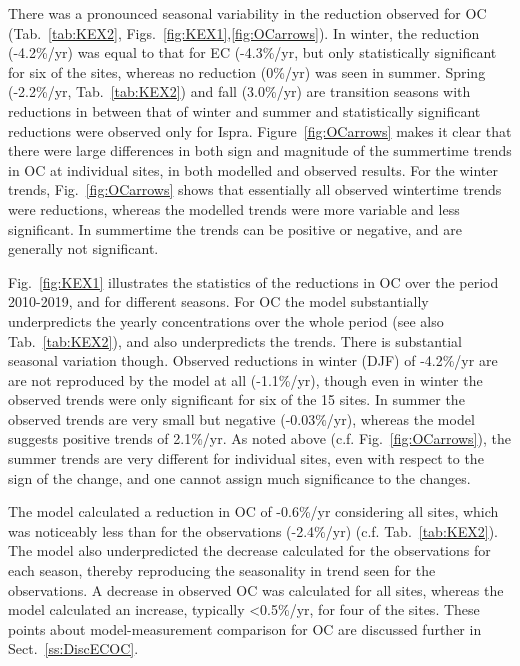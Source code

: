 
There was a pronounced seasonal variability in the reduction observed for
OC (Tab.~\ref{tab:KEX2}, Figs.~\ref{fig:KEX1},\ref{fig:OCarrows}). In winter, the
 reduction (-4.2\%/yr) was equal to that for
EC (-4.3\%/yr, but only statistically significant for six of the sites,
whereas no reduction (0\%/yr) was seen in summer. Spring (-2.2\%/yr, Tab.~\ref{tab:KEX2}) and fall (3.0\%/yr) are transition seasons with reductions in between
that of winter and summer and statistically significant reductions were
observed only for Ispra. 
%
Figure~\ref{fig:OCarrows} makes it clear that there were large differences in both sign and magnitude of the summertime trends in OC at individual sites, in both modelled and observed results. For the winter trends, Fig.~\ref{fig:OCarrows} shows that essentially all observed wintertime trends were reductions, whereas the modelled trends were more variable and less significant. In summertime the trends can be positive or negative, and are generally not significant.


Fig.~\ref{fig:KEX1} illustrates the statistics of the reductions in OC  over the period 2010-2019, and for different seasons. For OC the model substantially underpredicts the yearly concentrations over the whole period (see also Tab.~\ref{tab:KEX2}), and also underpredicts the trends. There is substantial seasonal variation though. Observed reductions in winter (DJF) of -4.2\%/yr are are not reproduced by the model at all (-1.1\%/yr), though even in winter the observed trends were only significant for six of the 15 sites. In summer the observed trends are very small but negative (-0.03\%/yr), whereas the model suggests positive trends of 2.1\%/yr. As noted above (c.f. Fig.~\ref{fig:OCarrows}), the summer trends are very different for individual sites, even with respect to the sign of the change, and one cannot assign much significance to the changes. 

The model calculated a
reduction in OC of -0.6\%/yr considering all sites, which was noticeably
less than for the observations (-2.4\%/yr) (c.f. Tab.~\ref{tab:KEX2}). The model also underpredicted
the decrease calculated for the observations for each season, thereby
reproducing the seasonality in trend seen for the observations. A decrease
in observed OC was calculated for all sites, whereas the model calculated
an increase, typically <0.5\%/yr, for four of the sites. These points about model-measurement comparison for OC are discussed further in Sect.~\ref{ss:DiscECOC}.


